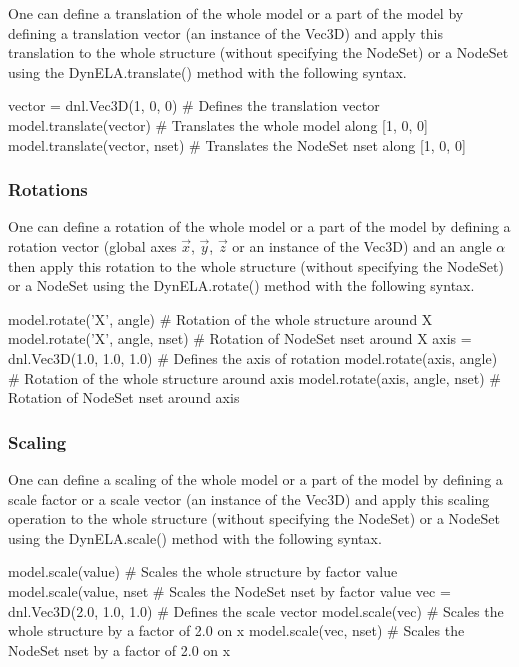 One can define a translation of the whole model or a part of the model by defining a translation vector (an instance of the \DynELA \textsf{Vec3D}) and apply this translation to the whole structure (without specifying the \textsf{NodeSet}) or a \textsf{NodeSet} using the \textsf{DynELA.translate()} method with the following syntax.

\begin{PythonListing}
vector = dnl.Vec3D(1, 0, 0)   # Defines the translation vector
model.translate(vector)       # Translates the whole model along [1, 0, 0]
model.translate(vector, nset) # Translates the NodeSet nset along [1, 0, 0]
\end{PythonListing}

\subsubsection{Rotations}

One can define a rotation of the whole model or a part of the model by defining a rotation vector (global axes $\overrightarrow{\ensuremath{x}}$, $\overrightarrow{y}$, $\overrightarrow{\ensuremath{z}}$ or an instance of the \DynELA \textsf{Vec3D}) and an angle $\alpha$ then apply this rotation to the whole structure (without specifying the \textsf{NodeSet}) or a \textsf{NodeSet} using the \textsf{DynELA.rotate()} method with the following syntax.

\begin{PythonListing}
model.rotate('X', angle)        # Rotation of the whole structure around X
model.rotate('X', angle, nset)  # Rotation of NodeSet nset around X
axis = dnl.Vec3D(1.0, 1.0, 1.0) # Defines the axis of rotation
model.rotate(axis, angle)       # Rotation of the whole structure around axis
model.rotate(axis, angle, nset) # Rotation of NodeSet nset around axis
\end{PythonListing}

\subsubsection{Scaling}

One can define a scaling of the whole model or a part of the model by defining a scale factor or a scale vector (an instance of the \DynELA \textsf{Vec3D}) and apply this scaling operation to the whole structure (without specifying the \textsf{NodeSet}) or a \textsf{NodeSet} using the \textsf{DynELA.scale()} method with the following syntax.

\begin{PythonListing}
model.scale(value)             # Scales the whole structure by factor value
model.scale(value, nset        # Scales the NodeSet nset by factor value
vec = dnl.Vec3D(2.0, 1.0, 1.0) # Defines the scale vector
model.scale(vec)               # Scales the whole structure by a factor of 2.0 on x
model.scale(vec, nset)         # Scales the NodeSet nset by a factor of 2.0 on x
\end{PythonListing}

